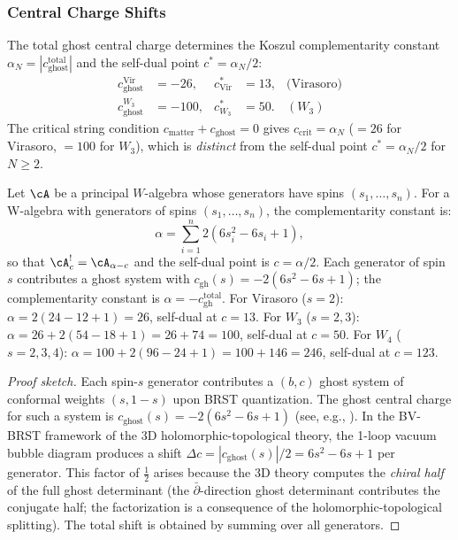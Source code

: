 \subsubsection{Central Charge Shifts}

The total ghost central charge determines the Koszul complementarity
constant $\alpha_N = |c_{\mathrm{ghost}}^{\mathrm{total}}|$
and the self-dual point $c^* = \alpha_N/2$:
\begin{align}
c_{\mathrm{ghost}}^{\mathrm{Vir}} &= -26, &
 c^*_{\mathrm{Vir}} &= 13, & \text{(Virasoro)}\\
c_{\mathrm{ghost}}^{W_3} &= -100, &
 c^*_{W_3} &= 50. & (W_3)
\end{align}
The critical string condition $c_{\mathrm{matter}} + c_{\mathrm{ghost}} = 0$
gives $c_{\mathrm{crit}} = \alpha_N$ ($= 26$ for Virasoro, $= 100$ for
$W_3$), which is \emph{distinct} from the self-dual point
$c^* = \alpha_N/2$ for $N \ge 2$.

\begin{theorem}
\label{thm:central-charge-shift}
Let\/ $\cA$ be a principal $W$-algebra whose generators have spins
$(s_1,\ldots,s_n)$.
For a W-algebra with generators of spins $(s_1, \ldots, s_n)$, the complementarity constant is:
\begin{equation}
\label{eq:central-charge-shift}
\alpha = \sum_{i=1}^n 2(6s_i^2 - 6s_i + 1),
\end{equation}
so that $\cA_c^! = \cA_{\alpha - c}$ and the self-dual point is $c = \alpha/2$.
Each generator of spin~$s$ contributes a ghost system with $c_{\mathrm{gh}}(s) = -2(6s^2 - 6s + 1)$;
the complementarity constant is $\alpha = -c_{\mathrm{gh}}^{\mathrm{total}}$.
For Virasoro ($s=2$): $\alpha = 2(24 - 12 + 1) = 26$, self-dual at $c = 13$. For $W_3$ ($s=2,3$): $\alpha = 26 + 2(54 - 18 + 1) = 26 + 74 = 100$, self-dual at $c = 50$. For $W_4$ ($s=2,3,4$): $\alpha = 100 + 2(96 - 24 + 1) = 100 + 146 = 246$, self-dual at $c = 123$.
\end{theorem}

\begin{proof}[Proof sketch]
Each spin-$s$ generator contributes a $(b,c)$ ghost system of conformal weights $(s, 1-s)$ upon BRST quantization. The ghost central charge for such a system is $c_{\text{ghost}}(s) = -2(6s^2 - 6s + 1)$ (see, e.g., \cite{FMS86,Pol98}). In the BV-BRST framework of the 3D holomorphic-topological theory, the 1-loop vacuum bubble diagram produces a shift $\Delta c = |c_{\text{ghost}}(s)|/2 = 6s^2 - 6s + 1$ per generator. This factor of $\tfrac{1}{2}$ arises because the 3D theory computes the \emph{chiral half} of the full ghost determinant (the $\bar\partial$-direction ghost determinant contributes the conjugate half; the factorization is a consequence of the holomorphic-topological splitting). The total shift is obtained by summing over all generators.
\end{proof}

